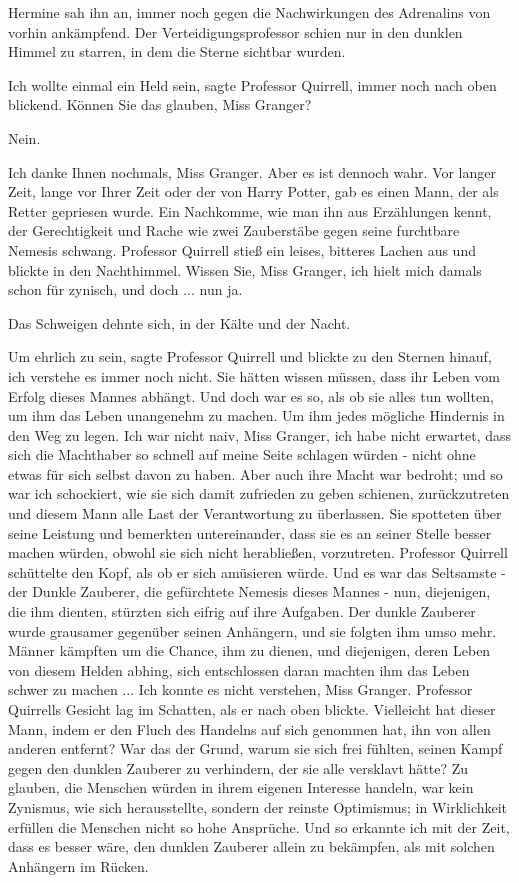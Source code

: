 Hermine sah ihn an, immer noch gegen die Nachwirkungen des Adrenalins von vorhin
ankämpfend. Der Verteidigungsprofessor schien nur in den dunklen Himmel zu
starren, in dem die Sterne sichtbar wurden.

\glqq{}Ich wollte einmal ein Held sein\grqq{}, sagte Professor Quirrell, immer
noch nach oben blickend. \glqq{}Können Sie das glauben, Miss Granger?\grqq{}

\glqq{}Nein.\grqq{}

\glqq{}Ich danke Ihnen nochmals, Miss Granger. Aber es ist dennoch wahr. Vor
langer Zeit, lange vor Ihrer Zeit oder der von Harry Potter, gab es einen Mann,
der als Retter gepriesen wurde. Ein Nachkomme, wie man ihn aus Erzählungen
kennt, der Gerechtigkeit und Rache wie zwei Zauberstäbe gegen seine furchtbare
Nemesis schwang.\grqq{} Professor Quirrell stieß ein leises, bitteres Lachen aus
und blickte in den Nachthimmel. \glqq{}Wissen Sie, Miss Granger, ich hielt mich
damals schon für zynisch, und doch ... nun ja.\grqq{}

Das Schweigen dehnte sich, in der Kälte und der Nacht.

\glqq{}Um ehrlich zu sein\grqq{}, sagte Professor Quirrell und blickte zu den
Sternen hinauf, \glqq{}ich verstehe es immer noch nicht. Sie hätten wissen
müssen, dass ihr Leben vom Erfolg dieses Mannes abhängt. Und doch war es so, als
ob sie alles tun wollten, um ihm das Leben unangenehm zu machen. Um ihm jedes
mögliche Hindernis in den Weg zu legen. Ich war nicht naiv, Miss Granger, ich
habe nicht erwartet, dass sich die Machthaber so schnell auf meine Seite
schlagen würden - nicht ohne etwas für sich selbst davon zu haben. Aber auch
ihre Macht war bedroht; und so war ich schockiert, wie sie sich damit zufrieden
zu geben schienen, zurückzutreten und diesem Mann alle Last der Verantwortung zu
überlassen. Sie spotteten über seine Leistung und bemerkten untereinander, dass
sie es an seiner Stelle besser machen würden, obwohl sie sich nicht herabließen,
vorzutreten.\grqq{} Professor Quirrell schüttelte den Kopf, als ob er sich
amüsieren würde. \glqq{}Und es war das Seltsamste - der Dunkle Zauberer, die
gefürchtete Nemesis dieses Mannes - nun, diejenigen, die ihm dienten, stürzten
sich eifrig auf ihre Aufgaben. Der dunkle Zauberer wurde grausamer gegenüber
seinen Anhängern, und sie folgten ihm umso mehr. Männer kämpften um die Chance,
ihm zu dienen, und diejenigen, deren Leben von diesem Helden abhing, sich
entschlossen daran machten ihm das Leben schwer zu machen ... Ich konnte es nicht
verstehen, Miss Granger.\grqq{} Professor Quirrells Gesicht lag im Schatten, als
er nach oben blickte. \glqq{}Vielleicht hat dieser Mann, indem er den Fluch des
Handelns auf sich genommen hat, ihn von allen anderen entfernt? War das der
Grund, warum sie sich frei fühlten, seinen Kampf gegen den dunklen Zauberer zu
verhindern, der sie alle versklavt hätte? Zu glauben, die Menschen würden in
ihrem eigenen Interesse handeln, war kein Zynismus, wie sich herausstellte,
sondern der reinste Optimismus; in Wirklichkeit erfüllen die Menschen nicht so
hohe Ansprüche. Und so erkannte ich mit der Zeit, dass es besser wäre, den
dunklen Zauberer allein zu bekämpfen, als mit solchen Anhängern im
Rücken.\grqq{}

